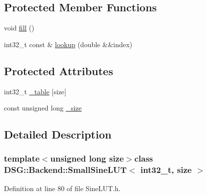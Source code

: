 \subsection*{Protected Member Functions}
\begin{DoxyCompactItemize}
\item 
void \hyperlink{classDSG_1_1Backend_1_1SmallSineLUT_3_01int32__t_00_01size_01_4_a88c1a17c38d0f8767bfdc899a22f7eba}{fill} ()
\item 
int32\+\_\+t const \& \hyperlink{classDSG_1_1Backend_1_1SmallSineLUT_3_01int32__t_00_01size_01_4_a9635d6cb5dd66d17c61ce09b3e437217}{lookup} (double \&\&index)
\end{DoxyCompactItemize}
\subsection*{Protected Attributes}
\begin{DoxyCompactItemize}
\item 
int32\+\_\+t \hyperlink{classDSG_1_1Backend_1_1LUT_a23615428e84d6be4424c8b897866f253}{\+\_\+table} \mbox{[}size\mbox{]}
\item 
const unsigned long \hyperlink{classDSG_1_1Backend_1_1LUT_ae18fa23936c51c1bdbd21311c9f1054e}{\+\_\+size}
\end{DoxyCompactItemize}


\subsection{Detailed Description}
\subsubsection*{template$<$unsigned long size$>$class D\+S\+G\+::\+Backend\+::\+Small\+Sine\+L\+U\+T$<$ int32\+\_\+t, size $>$}



Definition at line 80 of file Sine\+L\+U\+T.\+h.




